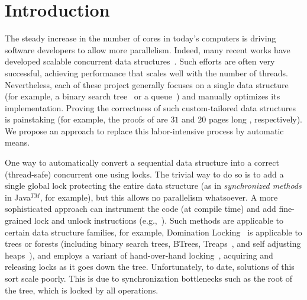 \section{Introduction} \label{sec:intro}

The steady increase in the number of  cores in today's computers is driving software developers to allow more parallelism.
Indeed, many recent works have developed scalable concurrent data
structures~\cite{ArbelA2014,DrachslerVY2014,NatarajanM2014,BrownER2014,CrainGR2013,BraginskyP2012,
AfekKKMT2012,EllenFRB2010,BronsonCCO2010,HerlihyLLS2007,Michael:1996}.
Such efforts are often very successful, achieving performance that scales well
with the number of threads.
Nevertheless, each of these project generally focuses on a single data structure
(for example, a binary search tree~\cite{ArbelA2014} or a queue~\cite{Michael:1996}) and manually optimizes its implementation.
Proving the correctness of such custom-tailored data structures is painstaking
(for example, the proofs of \cite{BraginskyP2012,EllenFRB2010} are $31$ and $20$ pages long , respectively).
We propose an approach to replace this labor-intensive process by automatic means.

One way to automatically convert a sequential data structure into a correct (thread-safe) concurrent one using locks.
The trivial way to do so is to add a single global lock protecting the entire data structure
(as in \emph{synchronized methods} in Java$^{TM}$, for example), but this allows no parallelism whatsoever.
A more sophisticated approach can instrument the code (at compile time) and add
fine-grained lock and unlock instructions (e.g.,~\cite{Gueta2011,MZGB:POPL06}). Such
methods are applicable to certain data structure families, for example,
Domination Locking~\cite{Gueta2011} is applicable to trees or forests
(including binary search trees, BTrees, Treaps~\cite{AragonS1989}, and self adjusting heaps~\cite{Sleator:SAH1986:SAH}),
and employs a variant of hand-over-hand locking~\cite{SilberschatzK1980},
acquiring and releasing locks as it goes down the tree.
Unfortunately, to date, solutions of this sort scale poorly.
This is due to synchronization bottlenecks such as the root of the tree,
which is locked by all operations.


